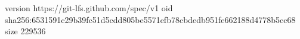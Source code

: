 version https://git-lfs.github.com/spec/v1
oid sha256:6531591c29b39fc51d5cdd805be5571efb78cbdedb951fe662188d4778b5cc68
size 229536
